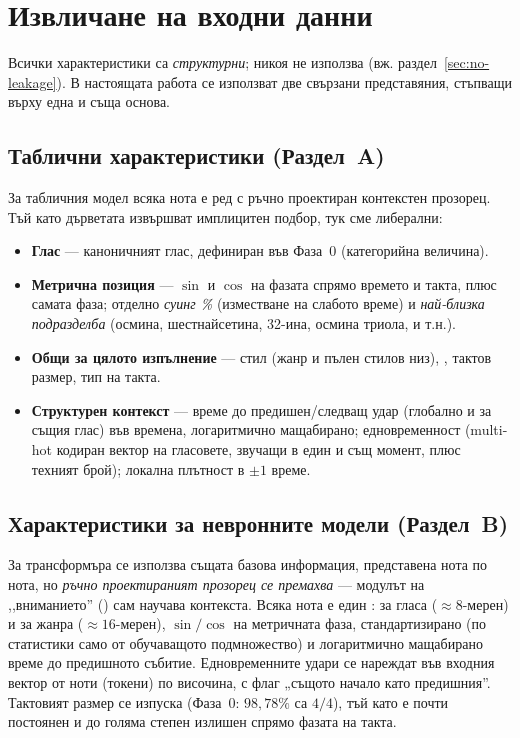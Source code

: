 \section{Извличане на входни данни}
\label{sec:feature-extraction}

Всички характеристики са \emph{структурни}; никоя не използва 
(вж. раздел~\ref{sec:no-leakage}). В настоящата работа се използват две свързани
представяния, стъпващи върху една и съща основа.

\subsection{Таблични характеристики (Раздел~A)}
\label{sec:features-a}

За табличния модел всяка нота е ред с ръчно проектиран контекстен прозорец. Тъй
като дърветата извършват имплицитен подбор, тук сме либерални:
\begin{itemize}
  \item \textbf{Глас} — каноничният глас, дефиниран във Фаза~0 (категорийна
        величина).
  \item \textbf{Метрична позиция} — $\sin$ и $\cos$ на фазата спрямо времето и такта,
        плюс самата фаза; отделно \emph{суинг \%} (изместване на слабото време) и
        \emph{най-близка подразделба} (осмина, шестнайсетина, 32-ина, осмина триола, и т.н.).
  \item \textbf{Общи за цялото изпълнение} — стил (жанр и пълен стилов низ), ,
        тактов размер, тип на такта.
  \item \textbf{Структурен контекст} — време до предишен/следващ удар (глобално и
        за същия глас) във времена, логаритмично мащабирано; едновременност (multi-hot кодиран
        вектор на гласовете, звучащи в един и същ момент, плюс техният брой); локална плътност в
        $\pm1$ време.
\end{itemize}

\subsection{Характеристики за невронните модели (Раздел~B)}
\label{sec:features-b}

За трансформъра се използва същата базова информация, представена нота по нота, но
\emph{ръчно проектираният прозорец се премахва} — модулът на ,,вниманието'' ()
сам научава контекста. Всяка нота е един :  за
гласа ($\approx8$-мерен) и за жанра ($\approx16$-мерен), $\sin/\cos$ на метричната
фаза, стандартизирано (по статистики само от обучаващото подмножество)  и
логаритмично мащабирано време до предишното събитие. Едновременните удари се
нареждат във входния вектор от ноти (токени) по височина, с флаг „същото начало като предишния''.
Тактовият размер се изпуска (Фаза~0: $98{,}78\%$ са $4/4$), тъй като е почти постоянен и до голяма
степен излишен спрямо фазата на такта.


